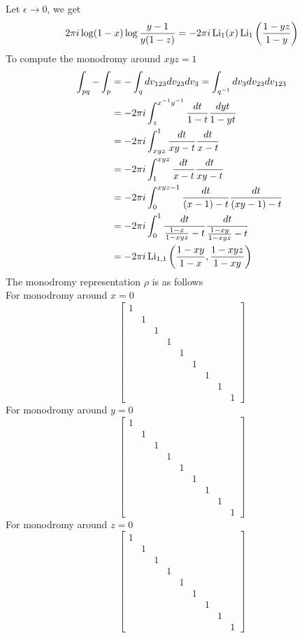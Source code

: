 \documentclass[main]{subfiles}
\begin{document}
Let $\epsilon\to0$, we get
\[2\pi i\log(1-x)\log\frac{y-1}{y(1-z)}=-2\pi i\operatorname{Li}_1(x)\operatorname{Li}_1\left(\frac{1-yz}{1-y}\right)\]
To compute the monodromy around $xyz=1$
\begin{align*}
\int_{pq}-\int_{p}&=-\int_qdv_{123}dv_{23}dv_3=\int_{q^{-1}}dv_{3}dv_{23}dv_{123} \\
&=-2\pi i\int_{z}^{x^{-1}y^{-1}}\frac{dt}{1-t}\frac{dyt}{1-yt} \\
&=-2\pi i\int_{xyz}^{1}\frac{dt}{xy-t}\frac{dt}{x-t} \\
&=-2\pi i\int_{1}^{xyz}\frac{dt}{x-t}\frac{dt}{xy-t} \\
&=-2\pi i\int_{0}^{xyz-1}\frac{dt}{(x-1)-t}\frac{dt}{(xy-1)-t} \\
&=-2\pi i\int_{0}^{1}\frac{dt}{\frac{1-x}{1-xyz}-t}\frac{dt}{\frac{1-xy}{1-xyz}-t} \\
&=-2\pi i\operatorname{Li}_{1,1}\left(\frac{1-xy}{1-x},\frac{1-xyz}{1-xy}\right)
\end{align*}
The monodromy representation $\rho$ is as follows \\
For monodromy around $x=0$
\[\begin{bmatrix}
1\\
&1\\
&&1\\
&&&1\\
&&&&1\\
&&&&&1\\
&&&&&&1\\
&&&&&&&1\\
&&&&&&&&1
\end{bmatrix}\]
For monodromy around $y=0$
\[\begin{bmatrix}
1\\
&1\\
&&1\\
&&&1\\
&&&&1\\
&&&&&1\\
&&&&&&1\\
&&&&&&&1\\
&&&&&&&&1
\end{bmatrix}\]
For monodromy around $z=0$
\[\begin{bmatrix}
1\\
&1\\
&&1\\
&&&1\\
&&&&1\\
&&&&&1\\
&&&&&&1\\
&&&&&&&1\\
&&&&&&&&1
\end{bmatrix}\]
\end{document}
